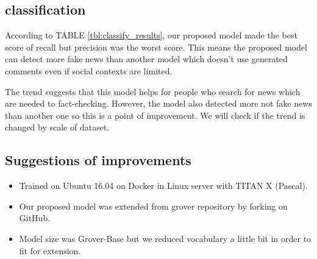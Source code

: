 \documentclass[conference]{IEEEtran}
\begin{document}
\subsection{classification}
According to TABLE \ref{tbl:classify_results}, our proposed model made the best score of recall but precision was the worst score.
This means the proposed model can detect more fake news than another model which doesn't use generated comments even if social contexts are limited. 

The trend suggests that this model helps for people who search for news which are needed to fact-checking. 
However, the model also detected more not fake news than another one so this is a point of improvement.
We will check if the trend is changed by scale of dataset.
\subsection{Suggestions of improvements}
\label{app:settings}
\begin{itemize}[]
    \item Trained on Ubuntu 16.04 on Docker in Linux server with TITAN X (Pascal).
    \item Our proposed model was extended from grover repository by forking on GitHub.
    \item Model size was Grover-Base but we reduced vocabulary a little bit in order to fit for extension.
\end{itemize}


\end{document}
